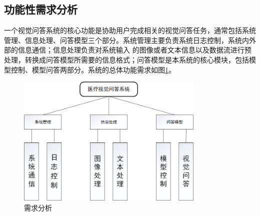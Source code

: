 \subsection{功能性需求分析}
一个视觉问答系统的核心功能是协助用户完成相关的视觉问答任务，通常包括系统管理、信息处理、问答模型三个部分。系统管理主要负责系统日志控制，系统内外部的信息通信；信息处理负责对系统输入
的图像或者文本信息以及数据流进行预处理，转换成问答模型所需要的信息格式；问答模型是本系统的核心模块，包括模型控制、模型问答两部分。系统的总体功能需求如图\ref{sys_need}。
\begin{figure}[htbp]
	\centering	
	\includegraphics[width=0.8\textwidth]{Fig/myfig/chapter5/sys_need.png}  %
	\caption{\label{sys_need}需求分析} 
\end{figure}

